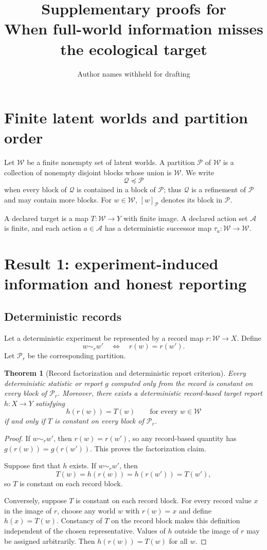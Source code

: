 \documentclass[11pt]{article}
\title{Supplementary proofs for\\When full-world information misses the ecological target}
\author{Author names withheld for drafting}
\date{}
\newtheorem{theorem}{Theorem}
\newcommand{\W}{\mathcal{W}}
\newcommand{\A}{\mathcal{A}}
\newcommand{\Pcal}{\mathcal{P}}
\newcommand{\Qcal}{\mathcal{Q}}
\begin{document}
\maketitle

\section{Finite latent worlds and partition order}
Let $\W$ be a finite nonempty set of latent worlds. A partition $\Pcal$ of $\W$ is a collection of nonempty disjoint blocks whose union is $\W$. We write
\[
\Qcal \preceq \Pcal
\]
when every block of $\Qcal$ is contained in a block of $\Pcal$; thus $\Qcal$ is a refinement of $\Pcal$ and may contain more blocks. For $w\in\W$, $[w]_{\Pcal}$ denotes its block in $\Pcal$.

A declared target is a map $T:\W\to Y$ with finite image. A declared action set $\A$ is finite, and each action $a\in\A$ has a deterministic successor map $\tau_a:\W\to\W$.

\section{Result 1: experiment-induced information and honest reporting}

\subsection{Deterministic records}
Let a deterministic experiment be represented by a record map $r:\W\to X$. Define
\[
w\sim_r w' \quad\Longleftrightarrow\quad r(w)=r(w').
\]
Let $\Pcal_r$ be the corresponding partition.

\begin{theorem}[Record factorization and deterministic report criterion]
Every deterministic statistic or report $g$ computed only from the record is constant on every block of $\Pcal_r$. Moreover, there exists a deterministic record-based target report $h:X\to Y$ satisfying
\[
h(r(w))=T(w)\qquad\text{for every }w\in\W
\]
if and only if $T$ is constant on every block of $\Pcal_r$.
\end{theorem}

\begin{proof}
If $w\sim_r w'$, then $r(w)=r(w')$, so any record-based quantity has
$g(r(w))=g(r(w'))$. This proves the factorization claim.

Suppose first that $h$ exists. If $w\sim_r w'$, then
\[
T(w)=h(r(w))=h(r(w'))=T(w'),
\]
so $T$ is constant on each record block.

Conversely, suppose $T$ is constant on each record block. For every record value $x$ in the image of $r$, choose any world $w$ with $r(w)=x$ and define $h(x)=T(w)$. Constancy of $T$ on the record block makes this definition independent of the chosen representative. Values of $h$ outside the image of $r$ may be assigned arbitrarily. Then $h(r(w))=T(w)$ for all $w$.
\end{proof}
\end{document}
